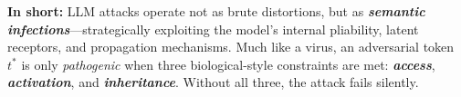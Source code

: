 \vspace{0.5em}
\noindent
\textbf{In short:} LLM attacks operate not as brute distortions, but as \textbf{\emph{semantic infections}}—strategically exploiting the model’s internal pliability, latent receptors, and propagation mechanisms. Much like a virus, an adversarial token $t^*$ is only \emph{pathogenic} when three biological-style constraints are met: \textbf{\emph{access}}, \textbf{\emph{activation}}, and \textbf{\emph{inheritance}}. Without all three, the attack fails silently.


